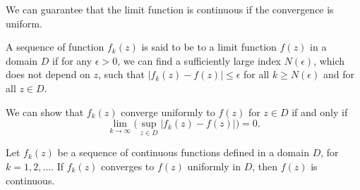 



We can guarantee that the limit function  is continuous if the convergence is uniform.


\begin{svgraybox}
	\begin{definition}
		A sequence of function $f_k(z)$ is said to be  to a limit function $f(z)$ in a domain $D$ if for any $\epsilon>0$, we can find a sufficiently large index $N(\epsilon)$, which does not depend on $z$, such that
		$
		|f_k(z) - f(z)| \leq \epsilon$
		for all $k\geq N(\epsilon)$ and for all $z\in D$. \label{def:uniform_convergence_real}
	\end{definition}
\end{svgraybox}

We can show that $f_k(z)$ converge uniformly to $f(z)$ for $z\in D$ if and only if
\begin{equation}
	\lim_{k\rightarrow\infty} \big( \sup_{z\in D} |f_k(z) - f(z)| \big) = 0.
	\label{eq:alternate_uniform_convergence}
\end{equation}

\begin{svgraybox}
	\begin{theorem}
		Let $f_k(z)$ be a sequence of continuous functions defined in a domain $D$, for $k=1,2,\ldots$. If $f_k(z)$ converges to $f(z)$ uniformly in $D$, then $f(z)$ is continuous.
		\label{thm:uniform_convergence_continuous}
	\end{theorem}
\end{svgraybox}

